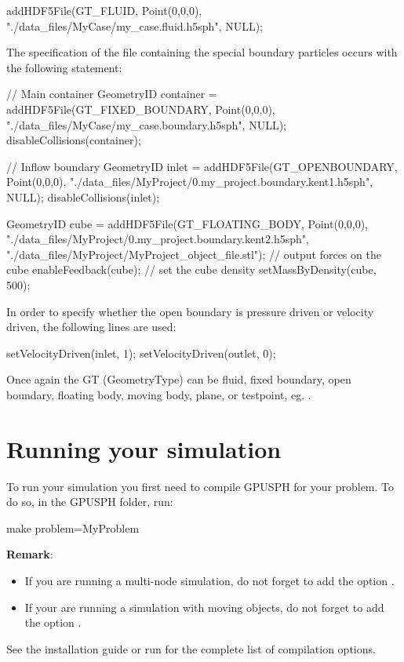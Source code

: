 \documentclass{../GPUSPHtemplate}
\begin{document}
\begin{ccode}
addHDF5File(GT_FLUID, Point(0,0,0), 
"./data_files/MyCase/my_case.fluid.h5sph",
NULL);
\end{ccode}
The specification of the file containing the special boundary particles occurs with the following statement:\\

\begin{ccode}
// Main container
GeometryID container =
addHDF5File(GT_FIXED_BOUNDARY, Point(0,0,0), 
  "./data_files/MyCase/my_case.boundary.h5sph",
  NULL);
disableCollisions(container);
  
// Inflow boundary 
GeometryID inlet =
  addHDF5File(GT_OPENBOUNDARY, Point(0,0,0), 
  "./data_files/MyProject/0.my_project.boundary.kent1.h5sph",
  NULL);
disableCollisions(inlet);

GeometryID cube =
  addHDF5File(GT_FLOATING_BODY, Point(0,0,0), 
  "./data_files/MyProject/0.my_project.boundary.kent2.h5sph",
  "./data_files/MyProject/MyProject_object_file.stl");
// output forces on the cube
enableFeedback(cube);
// set the cube density
setMassByDensity(cube, 500);

\end{ccode}

In order to specify whether the open boundary is pressure driven or velocity driven, the following lines
are used:
\begin{shellcode}
setVelocityDriven(inlet, 1);
setVelocityDriven(outlet, 0);
\end{shellcode}

Once again the GT (GeometryType) can be fluid, fixed boundary, open boundary, 
floating body, moving body, plane, or testpoint, eg. . 

\section{Running your simulation}\label{sec:run}
To run your simulation you first need to compile GPUSPH for your problem.
To do so, in the GPUSPH folder, run:
\begin{shellcode}
make problem=MyProblem
\end{shellcode}
\textbf{Remark}:
\begin{itemize}
\item If you are running a multi-node simulation, do not forget to add the option
.
\item If your are running a simulation with moving objects, do not forget to add the
option .
\end{itemize}
See the installation guide or run  for the complete list of compilation options.
\end{document}
